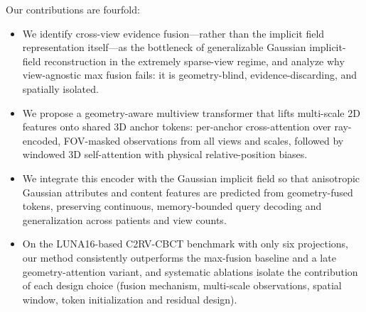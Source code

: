 Our contributions are fourfold:
\begin{itemize}
  \item We identify cross-view evidence fusion---rather than the implicit
  field representation itself---as the bottleneck of generalizable Gaussian
  implicit-field reconstruction in the extremely sparse-view regime, and
  analyze why view-agnostic max fusion fails: it is geometry-blind,
  evidence-discarding, and spatially isolated.
  \item We propose a geometry-aware multiview transformer that lifts
  multi-scale 2D features onto shared 3D anchor tokens: per-anchor
  cross-attention over ray-encoded, FOV-masked observations from all views and
  scales, followed by windowed 3D self-attention with physical
  relative-position biases.
  \item We integrate this encoder with the Gaussian implicit field so that
  anisotropic Gaussian attributes and content features are predicted from
  geometry-fused tokens, preserving continuous, memory-bounded query decoding
  and generalization across patients and view counts.
  \item On the LUNA16-based C2RV-CBCT benchmark with only six projections,
  our method consistently outperforms the max-fusion baseline and a late
  geometry-attention variant, and systematic ablations isolate the
  contribution of each design choice (fusion mechanism, multi-scale
  observations, spatial window, token initialization and residual design).
\end{itemize}

